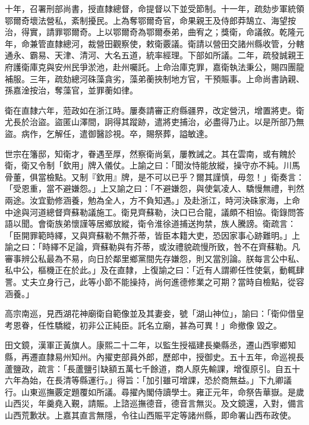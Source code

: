 \begin{pinyinscope}
十年，召署刑部尚書，授直隸總督，命提督以下並受節制。十一年，疏劾步軍統領鄂爾奇壞法營私，紊制擾民。上為奪鄂爾奇官，命果親王及侍郎莽鵠立、海望按治，得實，請罪鄂爾奇。上以鄂爾奇為鄂爾泰弟，曲宥之；獎衛，命議敘。乾隆元年，命兼管直隸總河，裁營田觀察使，敕衛覈議。衛請以營田交諸州縣收管，分轄通永、霸易、天津、清河、大名五道，統率經理。下部如所議。二年，疏發誠親王府護衛庫克與安州民爭淤池，赴州囑託。上命治庫克罪，嘉衛執法秉公，賜四團龍補服。三年，疏劾總河硃藻貪劣，藻弟蘅挾制地方官，干預賑事。上命尚書訥親、孫嘉淦按治，奪藻官，並罪蘅如律。

衛在直隸六年，蒞政如在浙江時。屢奏請審正府縣疆界，改定營汛，增置將吏。衛尤長於治盜。盜匿山澤間，詗得其蹤跡，遣將吏捕治，必盡得乃止。以是所部乃無盜。病作，乞解任，遣御醫診視。卒，賜祭葬，謚敏達。

世宗在籓邸，知衛才，眷遇至厚，然察衛尚氣，屢教誡之。其在雲南，或有餽於衛，衛又令制「欽用」牌入儀仗。上諭之曰：「聞汝恃能放縱，操守亦不純。川馬骨董，俱當檢點。又制『欽用』牌，是不可以已乎？爾其謹慎，毋忽！」衛奏言：「受恩重，當不避嫌怨。」上又諭之曰：「不避嫌怨，與使氣凌人、驕慢無禮，判然兩途。汝宜勤修涵養，勉為全人，方不負知遇。」及赴浙江，時河決硃家海，上命中途與河道總督齊蘇勒議施工。衛見齊蘇勒，決口已合龍，議頗不相協。衛錄問答語以聞。會衛族弟懷謹等居鄉放縱，衛令淮徐道捕送拘禁，族人騰謗。衛疏言：「臣開罪範時繹，又與齊蘇勒不無芥蒂，皆臣本籍大吏，恐因家事心跡難明。」上諭之曰：「時繹不足論，齊蘇勒與有芥蒂，或汝禮貌疏慢所致，咎不在齊蘇勒。凡審事辨公私最為不易，向日於鄰里鄉黨間先存嫌怨，則又當別論。朕每言公中私、私中公，樞機正在於此。」及在直隸，上復諭之曰：「近有人謂卿任性使氣，動輒肆詈。丈夫立身行己，此等小節不能操持，尚何進德修業之可期？當時自檢點，從容涵養。」

高宗南巡，見西湖花神廟衛自範像並及其妻妾，號「湖山神位」，諭曰：「衛仰借皇考恩眷，任性驕縱，初非公正純臣。託名立廟，甚為可異！」命撤像毀之。

田文鏡，漢軍正黃旗人。康熙二十二年，以監生授福建長樂縣丞，遷山西寧鄉知縣，再遷直隸易州知州。內擢吏部員外郎，歷郎中，授御史。五十五年，命巡視長蘆鹽政，疏言：「長蘆鹽引缺額五萬七千餘道，商人原先輸課，增復原引。自五十六年為始，在長清等縣運行。」得旨：「加引雖可增課，恐於商無益。」下九卿議行。山東巡撫覈定題覆如所議。尋擢內閣侍讀學士。雍正元年，命祭告華嶽。是歲山西災，年羹堯入覲，請賑。上諮巡撫德音，德音言無災。及文鏡還，入對，備言山西荒歉狀。上嘉其直言無隱，令往山西賑平定等諸州縣，即命署山西布政使。


\end{pinyinscope}
